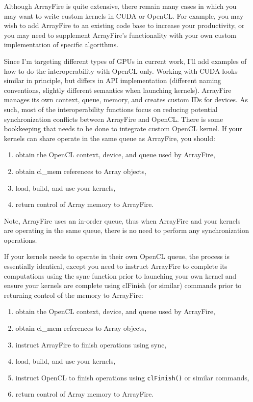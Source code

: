 Although ArrayFire is quite extensive, there remain many cases in which you may want to write custom kernels in CUDA or OpenCL. For example, you may wish to add ArrayFire to an existing code base to increase your productivity, or you may need to supplement ArrayFire's functionality with your own custom implementation of specific algorithms.

Since I'm targeting different types of GPUs in current work, I'll add examples of how to do the interoperability with OpenCL only. Working with CUDA looks similar in principle, but differs in API implementation (different naming conventions, slightly different semantics when launching kernels).
ArrayFire manages its own context, queue, memory, and creates custom IDs for devices. As such, most of the interoperability functions focus on reducing potential synchronization conflicts between ArrayFire and OpenCL. There is some bookkeeping that needs to be done to integrate custom OpenCL kernel. If your kernels can share operate in the same queue as ArrayFire, you should:

\begin{enumerate}
\item obtain the OpenCL context, device, and queue used by ArrayFire,
\item obtain cl_mem references to Array objects,
\item load, build, and use your kernels,
\item return control of Array memory to ArrayFire.
\end{enumerate}

Note, ArrayFire uses an in-order queue, thus when ArrayFire and your kernels are operating in the same queue, there is no need to perform any synchronization operations.

If your kernels needs to operate in their own OpenCL queue, the process is essentially identical, except you need to instruct ArrayFire to complete its computations using the sync function prior to launching your own kernel and ensure your kernels are complete using clFinish (or similar) commands prior to returning control of the memory to ArrayFire:

\begin{enumerate}
\item obtain the OpenCL context, device, and queue used by ArrayFire,
\item obtain cl_mem references to Array objects,
\item instruct ArrayFire to finish operations using sync,
\item load, build, and use your kernels,
\item instruct OpenCL to finish operations using \texttt{clFinish()} or similar commands,
\item return control of Array memory to ArrayFire.
\end{enumerate}

